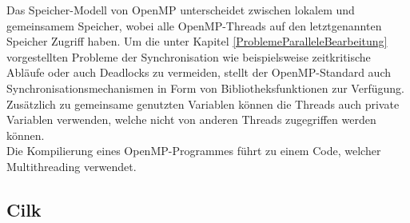 			Das Speicher-Modell von OpenMP unterscheidet zwischen lokalem und gemeinsamem Speicher, wobei alle OpenMP-Threads auf den letztgenannten Speicher Zugriff haben. Um die unter Kapitel \ref{ProblemeParalleleBearbeitung} vorgestellten Probleme der Synchronisation wie beispielsweise zeitkritische Abläufe oder auch Deadlocks zu vermeiden, stellt der OpenMP-Standard auch Synchronisationsmechanismen in Form von Bibliotheksfunktionen zur Verfügung. Zusätzlich zu gemeinsame genutzten Variablen können die Threads auch private Variablen verwenden, welche nicht von anderen Threads zugegriffen werden können.\\
			Die Kompilierung eines OpenMP-Programmes führt zu einem Code, welcher Multithreading verwendet. \cite{ParaProgRauber} \cite{OpenMPWikipedia}

		\subsection{Cilk}
			\label{Cilk}
			
